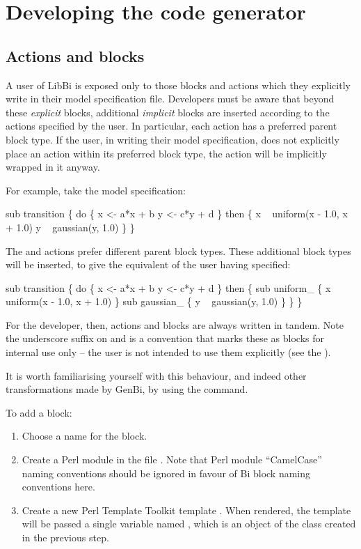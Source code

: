 \section{Developing the code generator}

\subsection{Actions and blocks}

A user of LibBi is exposed only to those blocks and actions which they
explicitly write in their model specification file. Developers must be aware
that beyond these \textit{explicit} blocks, additional \textit{implicit}
blocks are inserted according to the actions specified by the user. In
particular, each action has a preferred parent block type. If the user, in
writing their model specification, does not explicitly place an action within
its preferred block type, the action will be implicitly wrapped in it anyway.

For example, take the model specification:
\begin{bicode}
sub transition \{
  do \{
    x <- a*x + b
    y <- c*y + d
  \} then \{
    x ~ uniform(x - 1.0, x + 1.0)
    y ~ gaussian(y, 1.0)
  \}
\}
\end{bicode}
The  and  actions prefer different
parent block types. These additional block types will be inserted, to give the
equivalent of the user having specified:
\begin{bicode}
sub transition \{
  do \{
    x <- a*x + b
    y <- c*y + d
  \} then \{
    sub uniform_ \{
      x ~ uniform(x - 1.0, x + 1.0)
    \}
    sub gaussian_ \{
      y ~ gaussian(y, 1.0)
    \}
  \}  
\}
\end{bicode}

For the developer, then, actions and blocks are always written in tandem.
Note the underscore suffix on  and  is a
convention that marks these as blocks for internal use only -- the user is not
intended to use them explicitly (see the ).

It is worth familiarising yourself with this behaviour, and indeed other
transformations made by GenBi, by using the  command.

To add a block:
\begin{enumerate}
\item Choose a name for the block.
\item Create a Perl module  in the
  file . Note that Perl module
  ``CamelCase'' naming conventions should be ignored in favour of Bi block
  naming conventions here.
\item Create a new Perl Template Toolkit template
  . When rendered, the template
  will be passed a single variable named , which is an object of
  the class created in the previous step.
\end{enumerate}

